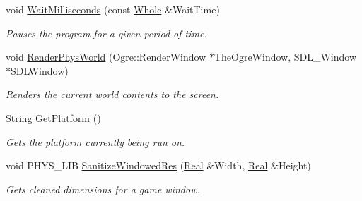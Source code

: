 \begin{DoxyCompactItemize}
void \hyperlink{namespacephys_1_1crossplatform_ab525e3abf3625b83954e2d55a5869d18}{WaitMilliseconds} (const \hyperlink{namespacephys_a460f6bc24c8dd347b05e0366ae34f34a}{Whole} \&WaitTime)
\begin{DoxyCompactList}\small\item\em Pauses the program for a given period of time. \item\end{DoxyCompactList}\item 
void \hyperlink{namespacephys_1_1crossplatform_a858c6c4155c4315d6eafb18cc30ce434}{RenderPhysWorld} (Ogre::RenderWindow $\ast$TheOgreWindow, SDL\_\-Window $\ast$SDLWindow)
\begin{DoxyCompactList}\small\item\em Renders the current world contents to the screen. \item\end{DoxyCompactList}\item 
\hyperlink{namespacephys_aa03900411993de7fbfec4789bc1d392e}{String} \hyperlink{namespacephys_1_1crossplatform_af34fd6dc13360417a87c579744932dce}{GetPlatform} ()
\begin{DoxyCompactList}\small\item\em Gets the platform currently being run on. \item\end{DoxyCompactList}\item 
void PHYS\_\-LIB \hyperlink{namespacephys_1_1crossplatform_ad74953ea69d7b708261b3fc0fc623644}{SanitizeWindowedRes} (\hyperlink{namespacephys_af7eb897198d265b8e868f45240230d5f}{Real} \&Width, \hyperlink{namespacephys_af7eb897198d265b8e868f45240230d5f}{Real} \&Height)
\begin{DoxyCompactList}\small\item\em Gets cleaned dimensions for a game window. \item\end{DoxyCompactList}\end{DoxyCompactItemize}


